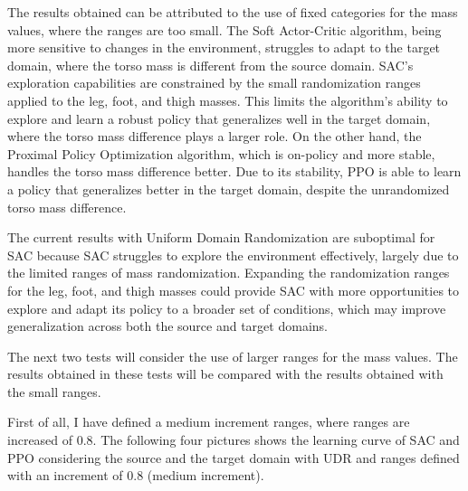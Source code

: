 \documentclass[12pt]{article}
\begin{document}
The results obtained can be attributed to the use of fixed categories for the mass values, where the ranges are too small. 
The Soft Actor-Critic algorithm, being more sensitive to changes in the environment, struggles to adapt to the target domain, where the torso mass is different from the source domain. SAC’s exploration capabilities are constrained by the small randomization ranges applied to the leg, foot, and thigh masses. This limits the algorithm's ability to explore and learn a robust policy that generalizes well in the target domain, where the torso mass difference plays a larger role.
On the other hand, the Proximal Policy Optimization algorithm, which is on-policy and more stable, handles the torso mass difference better. Due to its stability, PPO is able to learn a policy that generalizes better in the target domain, despite the unrandomized torso mass difference.

The current results with Uniform Domain Randomization are suboptimal for SAC because SAC struggles to explore the environment effectively, largely due to the limited ranges of mass randomization. Expanding the randomization ranges for the leg, foot, and thigh masses could provide SAC with more opportunities to explore and adapt its policy to a broader set of conditions, which may improve generalization across both the source and target domains. 

The next two tests will consider the use of larger ranges for the mass values. The results obtained in these tests will be compared with the results obtained with the small ranges.

First of all, I have defined a medium increment ranges, where ranges are increased of 0.8. The following four pictures shows the learning curve of SAC and PPO considering the source and the target domain with UDR and ranges defined with an increment of 0.8 (medium increment).
\end{document}
